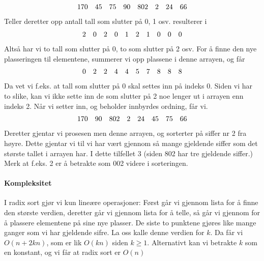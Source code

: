 \begin{example}
  \begin{displaymath}
    \begin{array}{c c c c c c c c}
      170&45&75&90&802&2&24&66
    \end{array}
  \end{displaymath}
  Teller deretter opp antall tall som slutter på 0, 1 osv. resulterer i
  \begin{displaymath}
    \begin{array}{c c c c c c c c c c}
      2&0&2&0&1&2&1&0&0&0
    \end{array}
  \end{displaymath}
  Altså har vi to tall som slutter på 0, to som slutter på 2 osv. For å finne
  den nye plasseringen til elementene, summerer vi opp plassene i denne arrayen,
  og får
  \begin{displaymath}
    \begin{array}{c c c c c c c c c c}
      0&2&2&4&4&5&7&8&8&8
    \end{array}
  \end{displaymath}
  Da vet vi f.eks. at tall som slutter på 0 skal settes inn på indeks 0. Siden
  vi har to slike, kan vi ikke sette inn de som slutter på 2 noe lenger ut i
  arrayen enn indeks 2. Når vi setter inn, og beholder innbyrdes ordning, får
  vi.
  \begin{displaymath}
    \begin{array}{c c c c c c c c}
      170&90&802&2&24&45&75&66
    \end{array}
  \end{displaymath}
  Deretter gjentar vi prosesen men denne arrayen, og sorterter på siffer nr 2
  fra høyre. Dette gjentar vi til vi har vært gjennom så mange gjeldende siffer
  som det største tallet i arrayen har. I dette tilfellet 3 (siden 802 har tre
  gjeldende siffer.) Merk at f.eks. 2 er å betrakte som 002 videre i sorteringen.
\end{example}

\paragraph{Kompleksitet}
I radix sort gjør vi kun lineære operasjoner: Først går vi gjennom lista for å
finne den største verdien, deretter går vi gjennom lista for å telle, så går vi
gjennom for å plassere elementene på sine nye plasser. De siste to punktene
gjøres like mange ganger som vi har gjeldende sifre. La oss kalle denne verdien
for $k$. Da får vi $O(n + 2kn)$, som er lik $O(kn)$ siden $k\geq 1$. Alternativt
kan vi betrakte $k$ som en konstant, og vi får at radix sort er $O(n)$


